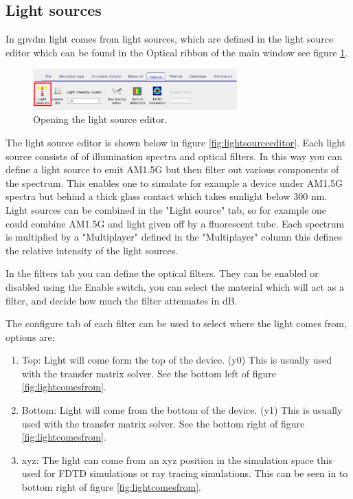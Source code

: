 \subsection{Light sources}
In gpvdm light comes from light sources, which are defined in the light source editor which can be found in the Optical ribbon of the main window see figure \ref{fig:opticalribbon}.

\begin{figure}[H]
\centering
\includegraphics[width=0.7\textwidth]{./images/light_ribbon.png}
\caption{Opening the light source editor.}
\label{fig:opticalribbon}
\end{figure}

The light source editor is shown below in figure \ref{fig:lightsourceeditor}. Each light source consists of of illumination spectra and optical filters. In this way you can define a light source to emit AM1.5G but then filter out various components of the spectrum.  This enables one to simulate for example a device under AM1.5G spectra but behind a thick glass contact which takes sunlight below 300 nm. Light sources can be combined in the "Light source" tab, so for example one could combine AM1.5G and light given off by a fluorescent tube. Each spectrum is multiplied by a "Multiplayer" defined in the "Multiplayer" column this defines the relative intensity of the light sources.

In the filters tab you can define the optical filters. They can be enabled or disabled using the Enable switch, you can select the material which will act as a filter, and decide how much the filter attenuates in dB.

The configure tab of each filter can be used to select where the light comes from, options are:

\begin{enumerate}
  \item Top: Light will come form the top of the device. (y0) This is usually used with the transfer matrix solver. See the bottom left of figure \ref{fig:lightcomesfrom}.
  \item Bottom: Light will come from the bottom of the device. (y1)  This is usually used with the transfer matrix solver.  See the bottom right of figure \ref{fig:lightcomesfrom}.
  \item xyz: The light can come from an xyz position in the simulation space this used for FDTD simulations or ray tracing simulations.  This can be seen in to bottom right of figure \ref{fig:lightcomesfrom}.
\end{enumerate}

